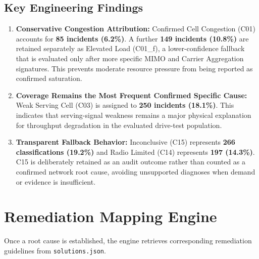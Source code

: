 \subsection{Key Engineering Findings}

\begin{enumerate}
\item \textbf{Conservative Congestion Attribution:} Confirmed Cell Congestion (C01) accounts for \textbf{85 incidents (6.2\%)}. A further \textbf{149 incidents (10.8\%)} are retained separately as Elevated Load (C01\_f), a lower-confidence fallback that is evaluated only after more specific MIMO and Carrier Aggregation signatures. This prevents moderate resource pressure from being reported as confirmed saturation.

\item \textbf{Coverage Remains the Most Frequent Confirmed Specific Cause:} Weak Serving Cell (C03) is assigned to \textbf{250 incidents (18.1\%)}. This indicates that serving-signal weakness remains a major physical explanation for throughput degradation in the evaluated drive-test population.

\item \textbf{Transparent Fallback Behavior:} Inconclusive (C15) represents \textbf{266 classifications (19.2\%)} and Radio Limited (C14) represents \textbf{197 (14.3\%)}. C15 is deliberately retained as an audit outcome rather than counted as a confirmed network root cause, avoiding unsupported diagnoses when demand or evidence is insufficient.
\end{enumerate}

\FloatBarrier

\section{Remediation Mapping Engine}

Once a root cause is established, the engine retrieves corresponding remediation guidelines from \texttt{solutions.json}.

